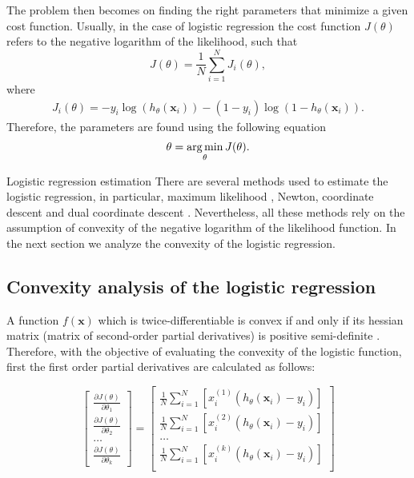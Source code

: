 The problem then becomes on finding the right parameters that minimize a given cost function.   
Usually, in the case of logistic regression the cost function $J(\theta)$ refers to the negative   
logarithm of the likelihood, such that
\begin{equation}
  J(\theta)=\frac{1}{N}\sum_{i=1}^{N} J_i(\theta),
\end{equation}
where
\begin{align}\label{eq:6:lrcost}
  J_i(\theta) =  -y_i\log(h_\theta(\mathbf{x}_i)) -(1-y_i)\log(1-h_\theta(\mathbf{x}_i)).
\end{align}
Therefore, the parameters are found using the following equation
\begin{align}
  \theta = \operatorname*{arg\,min}_\theta J(\theta).
\end{align}

\begin{remark}{Logistic regression estimation}
There are several methods used to estimate the logistic regression, in particular, maximum 
likelihood \citep{Hastie2009}, Newton, coordinate descent \citep{Murphy2012} and dual coordinate 
descent \citep{Yu2011}. Nevertheless, all these methods rely on the assumption of convexity of the
negative logarithm of the likelihood function. In the next section we analyze the convexity of the 
logistic regression.
\end{remark}

\subsection{Convexity analysis of the logistic regression}

A function $f(\mathbf{x})$ which is twice-differentiable is convex if and only if its hessian 
matrix (matrix of second-order partial derivatives) is positive semi-definite \citep{Boyd2010}.
Therefore, with the objective of evaluating the convexity of the logistic function, first the first 
order partial derivatives are calculated as follows:

\begin{equation}
\left[ \begin{array}{c}
  \frac{\partial J(\theta)}{\partial \theta_1} \\[0.1in]	
  \frac{\partial J(\theta)}{\partial \theta_2} \\[0.1in]	
  \ldots \\[0.1in]	
  \frac{\partial J(\theta)}{\partial \theta_k}
\end{array} \right] =
\left[ \begin{array}{c}
  \frac{1}{N}\sum_{i=1}^{N}\left[x_i^{(1)}\left(h_\theta(\mathbf{x}_i)-y_i\right)\right]\\[0.1in]
  \frac{1}{N}\sum_{i=1}^{N}\left[x_i^{(2)}\left(h_\theta(\mathbf{x}_i)-y_i\right)\right]\\[0.1in]
  \ldots \\[0.1in]	
  \frac{1}{N}\sum_{i=1}^{N}\left[x_i^{(k)}\left(h_\theta(\mathbf{x}_i)-y_i\right)\right]\\[0.1in]	
\end{array} \right]
\end{equation}

